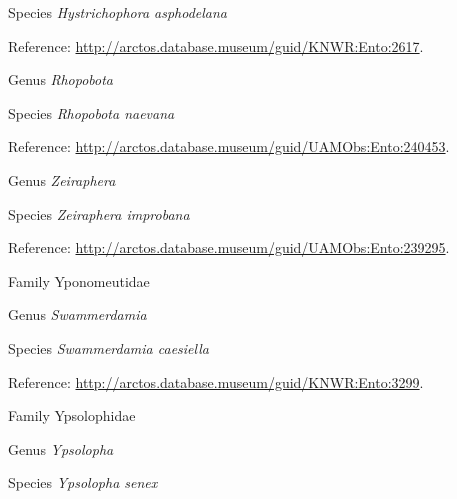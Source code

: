 \documentclass[9pt, article]{memoir}
\begin{document}
\begin{multicols}{2}
\vspace{6pt}\noindent\hspace{36pt}Species \textit{Hystrichophora asphodelana}


\vspace{6pt}Reference: 
\url{http://arctos.database.museum/guid/KNWR:Ento:2617}.

\vspace{6pt}\noindent\hspace{30pt}Genus \textit{Rhopobota}


\vspace{6pt}\noindent\hspace{36pt}Species \textit{Rhopobota naevana}


\vspace{6pt}Reference: 
\url{http://arctos.database.museum/guid/UAMObs:Ento:240453}.

\vspace{6pt}\noindent\hspace{30pt}Genus \textit{Zeiraphera}


\vspace{6pt}\noindent\hspace{36pt}Species \textit{Zeiraphera improbana}


\vspace{6pt}Reference: 
\url{http://arctos.database.museum/guid/UAMObs:Ento:239295}.

\vspace{6pt}\noindent\hspace{24pt}Family Yponomeutidae


\vspace{6pt}\noindent\hspace{30pt}Genus \textit{Swammerdamia}


\vspace{6pt}\noindent\hspace{36pt}Species \textit{Swammerdamia caesiella}


\vspace{6pt}Reference: 
\url{http://arctos.database.museum/guid/KNWR:Ento:3299}.

\vspace{6pt}\noindent\hspace{24pt}Family Ypsolophidae


\vspace{6pt}\noindent\hspace{30pt}Genus \textit{Ypsolopha}


\vspace{6pt}\noindent\hspace{36pt}Species \textit{Ypsolopha senex}



\end{multicols}
\end{document}
